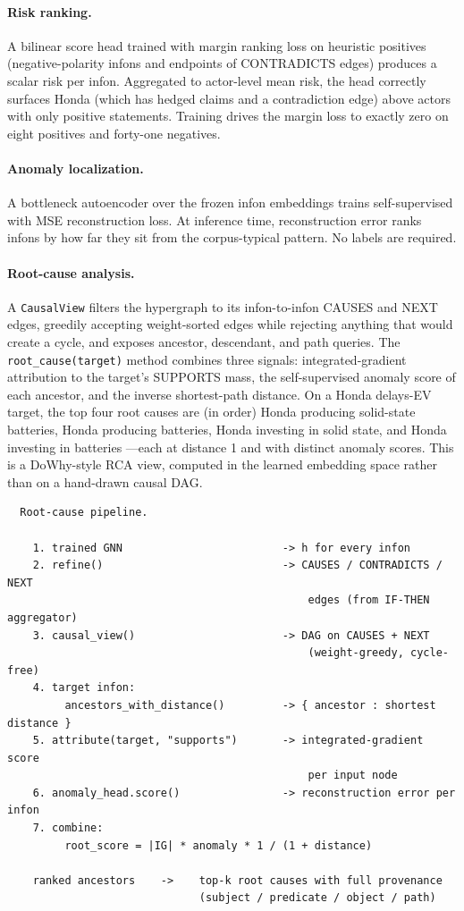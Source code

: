 \documentclass[11pt,a4paper]{article}
\begin{document}
\paragraph{Risk ranking.} A bilinear score head trained with
margin ranking loss on heuristic positives (negative-polarity
infons and endpoints of CONTRADICTS edges) produces a scalar
risk per infon. Aggregated to actor-level mean risk, the head
correctly surfaces Honda (which has hedged claims and a
contradiction edge) above actors with only positive statements.
Training drives the margin loss to exactly zero on eight positives
and forty-one negatives.

\paragraph{Anomaly localization.} A bottleneck autoencoder over
the frozen infon embeddings trains self-supervised with MSE
reconstruction loss. At inference time, reconstruction error
ranks infons by how far they sit from the corpus-typical pattern.
No labels are required.

\paragraph{Root-cause analysis.} A \texttt{CausalView} filters
the hypergraph to its infon-to-infon CAUSES and NEXT edges,
greedily accepting weight-sorted edges while rejecting anything
that would create a cycle, and exposes ancestor, descendant,
and path queries. The \texttt{root\_cause(target)} method combines
three signals: integrated-gradient attribution to the target's
SUPPORTS mass, the self-supervised anomaly score of each
ancestor, and the inverse shortest-path distance. On a Honda
delays-EV target, the top four root causes are (in order) Honda
producing solid-state batteries, Honda producing batteries,
Honda investing in solid state, and Honda investing in batteries
---each at distance 1 and with distinct anomaly scores. This is
a DoWhy-style RCA view, computed in the learned embedding space
rather than on a hand-drawn causal DAG.

\begin{verbatim}
  Root-cause pipeline.

    1. trained GNN                         -> h for every infon
    2. refine()                            -> CAUSES / CONTRADICTS / NEXT
                                               edges (from IF-THEN aggregator)
    3. causal_view()                       -> DAG on CAUSES + NEXT
                                               (weight-greedy, cycle-free)
    4. target infon:
         ancestors_with_distance()         -> { ancestor : shortest distance }
    5. attribute(target, "supports")       -> integrated-gradient score
                                               per input node
    6. anomaly_head.score()                -> reconstruction error per infon
    7. combine:
         root_score = |IG| * anomaly * 1 / (1 + distance)

    ranked ancestors    ->    top-k root causes with full provenance
                              (subject / predicate / object / path)
\end{verbatim}
\end{document}
